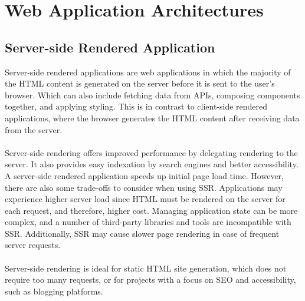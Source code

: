 \section{Web Application Architectures}
\subsection{Server-side Rendered Application}
Server-side rendered applications are web applications in which the majority of the HTML content is generated on the server before it is sent to the user's browser. Which can also include fetching data from APIs, composing components together, and applying styling. This is in contrast to client-side rendered applications, where the browser generates the HTML content after receiving data from the server.\\\\
Server-side rendering offers improved performance by delegating rendering to the server. It also provides easy indexation by search engines and better accessibility. A server-side rendered application speeds up initial page load time. However, there are also some trade-offs to consider when using SSR. Applications may experience higher server load since HTML must be rendered on the server for each request, and therefore, higher cost. Managing application state can be more complex, and a number of third-party libraries and tools are incompatible with SSR. Additionally, SSR may cause slower page rendering in case of frequent server requests.\\\\
Server-side rendering is ideal for static HTML site generation, which does not require too many requests, or for projects with a focus on SEO and accessibility, such as blogging platforms.
